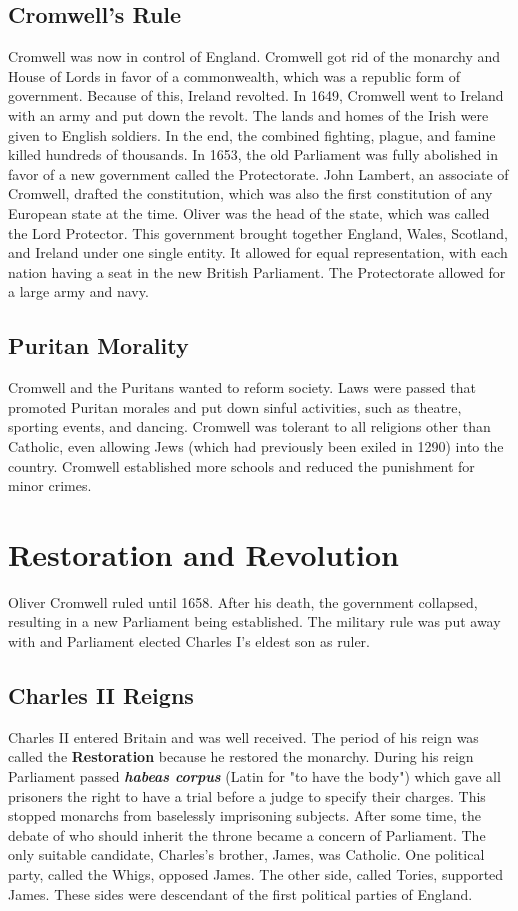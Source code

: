 \documentclass[11pt]{article}
\begin{document}
\subsection{Cromwell's Rule}
\label{sec:org1a15422}
Cromwell was now in control of England. Cromwell got rid of the monarchy and House of Lords in favor of a commonwealth, which was a republic form of government. Because of this, Ireland revolted. In 1649, Cromwell went to Ireland with an army and put down the revolt. The lands and homes of the Irish were given to English soldiers. In the end, the combined fighting, plague, and famine killed hundreds of thousands. In 1653, the old Parliament was fully abolished in favor of a new government called the Protectorate. John Lambert, an associate of Cromwell, drafted the constitution, which was also the first constitution of any European state at the time. Oliver was the head of the state, which was called the Lord Protector. This government brought together England, Wales, Scotland, and Ireland under one single entity. It allowed for equal representation, with each nation having a seat in the new British Parliament. The Protectorate allowed for a large army and navy.
\subsection{Puritan Morality}
\label{sec:orgaec40f5}
Cromwell and the Puritans wanted to reform society. Laws were passed that promoted Puritan morales and put down sinful activities, such as theatre, sporting events, and dancing. Cromwell was tolerant to all religions other than Catholic, even allowing Jews (which had previously been exiled in 1290) into the country. Cromwell established more schools and reduced the punishment for minor crimes.
\section{Restoration and Revolution}
\label{sec:org96554e0}
Oliver Cromwell ruled until 1658. After his death, the government collapsed, resulting in a new Parliament being established. The military rule was put away with and Parliament elected Charles I's eldest son as ruler.
\subsection{Charles II Reigns}
\label{sec:org5d16691}
Charles II entered Britain and was well received. The period of his reign was called the \textbf{Restoration} because he restored the monarchy.
During his reign Parliament passed \emph{\textbf{habeas corpus}} (Latin for "to have the body") which gave all prisoners the right to have a trial before a judge to specify their charges. This stopped monarchs from baselessly imprisoning subjects. After some time, the debate of who should inherit the throne became a concern of Parliament. The only suitable candidate, Charles's brother, James, was Catholic. One political party, called the Whigs, opposed James. The other side, called Tories, supported James. These sides were descendant of the first political parties of England.
\end{document}
